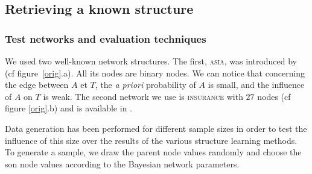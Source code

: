\subsection{Retrieving a known structure}
\subsubsection*{Test networks and evaluation techniques}

We used two well-known network structures. The first, \textsc{asia}, was introduced by \cite{Lau88} (cf figure~\ref{orig}.a).
All its nodes are binary nodes. We can notice that concerning the edge between $A$ et $T$, the  \emph{a priori} probability of $A$ is small, and the influence of $A$ on $T$ is weak.
The second network we use is \textsc{insurance} with $27$ nodes (cf figure \ref{orig}.b) and is available in \cite{BNR97}.

Data generation has been performed for different sample sizes in order to test the influence of this size over the results of the various structure learning methods.
To generate a sample, we draw the parent node values randomly and choose the son node values according to the Bayesian network parameters.
\vspace*{-\baselineskip}

